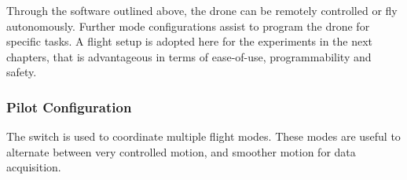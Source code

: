 Through the software outlined above, the drone can be remotely controlled or fly autonomously. Further mode configurations assist to program the drone for specific tasks. A flight setup is adopted here for the experiments in the next chapters, that is advantageous in terms of ease-of-use, programmability and safety.



\subsubsection{Pilot Configuration }\label{section:pilot_modes}

The switch is used to coordinate multiple flight modes. These modes are useful to alternate between very controlled motion, and smoother motion for data acquisition.



